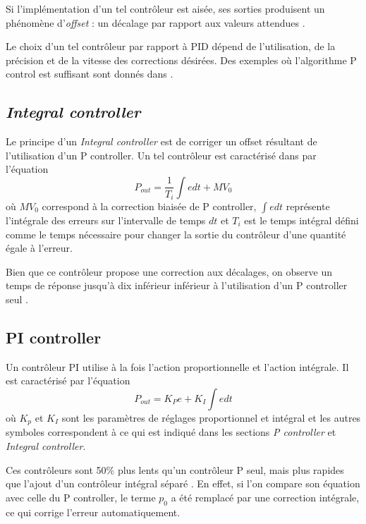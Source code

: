 \documentclass[a4paper,10pt]{report}
\begin{document}
Si l'implémentation d'un tel contrôleur est aisée, ses sorties produisent un phénomène d'\emph{offset} : un décalage par rapport aux valeurs attendues \cite{svrcek2014real}.

Le choix d'un tel contrôleur par rapport à PID dépend de l'utilisation, de la précision et de la vitesse des corrections désirées.
Des exemples où l'algorithme P control est suffisant sont donnés dans \cite{sellers2001overview}.

\subsection{\emph{Integral controller}}
Le principe d'un \emph{Integral controller} est de corriger un offset résultant de l'utilisation d'un P controller.
Un tel contrôleur est caractérisé dans \cite{svrcek2014real} par l'équation
\begin{equation}P_{out} = \frac{1}{T_{i}}\int e dt + MV_{0}\end{equation}
où $MV_{0}$ correspond à la correction biaisée de P controller,
$\int e dt$ représente l'intégrale des erreurs sur l'intervalle de temps $dt$ et $T_{i}$ est le temps intégral défini comme le temps nécessaire pour changer la sortie du contrôleur d'une quantité égale à l'erreur.

Bien que ce contrôleur propose une correction aux décalages, on observe un temps de réponse jusqu'à dix inférieur inférieur à l'utilisation d'un P controller seul \cite{svrcek2014real}.

\subsection{PI controller}
Un contrôleur PI utilise à la fois l'action proportionnelle et l'action intégrale.
Il est caractérisé par l'équation
\begin{equation}P_{out} = K_{P} e + K_{I} \int e dt\end{equation}
où $K_{p}$ et $K_{I}$ sont les paramètres de réglages proportionnel et intégral
et les autres symboles correspondent à ce qui est indiqué dans les sections \emph{P controller} et \emph{Integral controller}.

Ces contrôleurs sont 50\% plus lents qu'un contrôleur P seul, mais plus rapides que l'ajout d'un contrôleur intégral séparé \cite{svrcek2014real}.
En effet, si l'on compare son équation avec celle du P controller, le terme $p_0$ a été remplacé par une correction intégrale, ce qui corrige l'erreur automatiquement.
\end{document}
